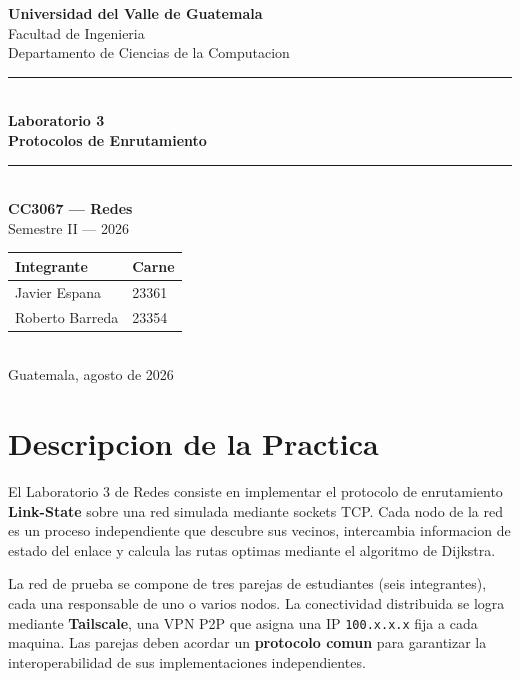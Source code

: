 ﻿\documentclass[12pt, a4paper]{article}
\begin{document}
\begin{titlepage}
    \centering
    \vspace*{1cm}
    {\Large \textbf{Universidad del Valle de Guatemala}\\[0.3cm]}
    {\large Facultad de Ingenieria\\[0.1cm]}
    {\large Departamento de Ciencias de la Computacion\\[1.8cm]}

    \rule{\textwidth}{1pt}\\[0.5cm]
    {\LARGE \textbf{Laboratorio 3}\\[0.3cm]}
    {\Large \textbf{Protocolos de Enrutamiento}}\\[0.3cm]
    \rule{\textwidth}{1pt}\\[1.8cm]

    {\large \textbf{CC3067 --- Redes}\\[0.4cm]}
    {\large Semestre II --- 2026\\[2cm]}

    \begin{tabular}{ll}
        \toprule
        \textbf{Integrante}   & \textbf{Carne} \\
        \midrule
        Javier Espana         & 23361          \\
        Roberto Barreda       & 23354          \\
        \bottomrule
    \end{tabular}\\[2cm]

    {\large Guatemala, agosto de 2026}
\end{titlepage}

\tableofcontents
\newpage

\section{Descripcion de la Practica}

El Laboratorio 3 de Redes consiste en implementar el protocolo de enrutamiento
\textbf{Link-State} sobre una red simulada mediante sockets TCP. Cada nodo de
la red es un proceso independiente que descubre sus vecinos, intercambia
informacion de estado del enlace y calcula las rutas optimas mediante el
algoritmo de Dijkstra.

La red de prueba se compone de tres parejas de estudiantes (seis integrantes),
cada una responsable de uno o varios nodos. La conectividad distribuida se
logra mediante \textbf{Tailscale}, una VPN P2P que asigna una IP
\texttt{100.x.x.x} fija a cada maquina. Las parejas deben acordar un
\textbf{protocolo comun} para garantizar la interoperabilidad de sus
implementaciones independientes.
\end{document}
